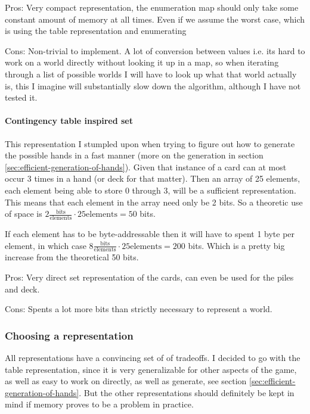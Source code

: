 Pros: Very compact representation, the enumeration map should only take some constant amount of memory at all times. Even if we assume the worst case, which is using the table representation and enumerating

Cons: Non-trivial to implement. A lot of conversion between values i.e. its hard to work on a world directly without looking it up in a map, so when iterating through a list of possible worlds I will have to look up what that world actually is, this I imagine will substantially slow down the algorithm, although I have not tested it.

\paragraph{Contingency table inspired set}
This representation I stumpled upon when trying to figure out how to generate the possible hands in a fast manner (more on the generation in section \ref{sec:efficient-generation-of-hands}).
Given that instance of a card can at most occur 3 times in a hand (or deck for that matter). Then an array of 25 elements, each element being able to store 0 through 3, will be a sufficient representation. This means that each element in the array need only be 2 bits. So a theoretic use of space is $2 \frac{\text{bits}}{\text{elements}} \cdot 25\text{elements} = 50$ bits. 

If each element has to be byte-addressable then it will have to spent 1 byte per element, in which case $8 \frac{\text{bits}}{\text{elements}} \cdot 25\text{elements} = 200$ bits. Which is a pretty big increase from the theoretical 50 bits.  

Pros: Very direct set representation of the cards, can even be used for the piles and deck. 

Cons: Spents a lot more bits than strictly necessary to represent a world.


\subsubsection{Choosing a representation}
All representations have a convincing set of of tradeoffs. I decided to go with the table representation, since it is very generalizable for other aspects of the game, as well as easy to work on directly, as well as generate, see section \ref{sec:efficient-generation-of-hands}. But the other representations should definitely be kept in mind if memory proves to be a problem in practice.


